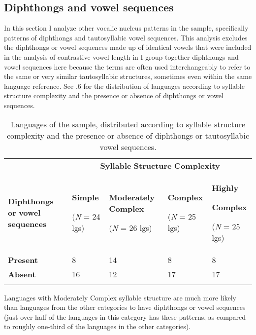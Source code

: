 \subsection{Diphthongs and vowel sequences}\label{sec:4.3.4}

  In this section I analyze other vocalic nucleus patterns in the sample, specifically patterns of diphthongs and tautosyllabic vowel sequences. This analysis excludes the diphthongs or vowel sequences made up of identical vowels that were included in the analysis of contrastive vowel length in  I group together diphthongs and vowel sequences here because the terms are often used interchangeably to refer to the same or very similar tautosyllabic structures, sometimes even within the same language reference. See .6 for the distribution of languages according to syllable structure complexity and the presence or absence of diphthongs or vowel sequences.

\begin{table}
\begin{tabularx}{\textwidth}{XXXXX}
 & \multicolumn{4}{c}{ \textbf{Syllable} \textbf{Structure} \textbf{Complexity}}\\
\lsptoprule
\textbf{Diphthongs} \textbf{or} \textbf{vowel} \textbf{sequences} & { \textbf{Simple}}

 (\textit{N} = 24 lgs) & { \textbf{Moderately} \textbf{Complex}}

 (\textit{N} = 26 lgs) & { \textbf{Complex}}

 (\textit{N} = 25 lgs) & { \textbf{Highly} }

{ \textbf{Complex}}

 (\textit{N} = 25 lgs)\\
\textbf{Present} & 8 & 14 & 8 & 8\\
\textbf{Absent} & 16 & 12 & 17 & 17\\
\lspbottomrule
\end{tabularx}
\caption{\label{4.6}Languages of the sample, distributed according to syllable structure complexity and the presence or absence of diphthongs or tautosyllabic vowel sequences.}
\end{table}

  Languages with Moderately Complex syllable structure are much more likely than languages from the other categories to have diphthongs or vowel sequences (just over half of the languages in this category has these patterns, as compared to roughly one-third of the languages in the other categories).

